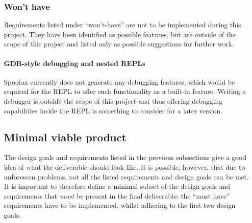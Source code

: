 \subsubsection{Won't have}

Requirements listed under ``won't-have'' are not to be implemented during this
project. They have been identified as possible features, but are outside of the
scope of this project and listed only as possible suggestions for further work.

\paragraph{GDB-style debugging and nested REPLs} Spoofax currently does not
generate any debugging features, which would be required for the REPL to offer
such functionality as a built-in feature. Writing a debugger is outside
the scope of this project and thus offering debugging capabilities inside
the REPL is something to consider for a later version.

\subsection{Minimal viable product}
\label{ssec:mvp}

The design goals and requirements listed in the previous subsections give a good
idea of what the deliverable should look like. It is possible, however, that due
to unforeseen problems, not all the listed requirements and design goals can be
met. It is important to therefore define a minimal subset of the design goals
and requirements that \emph{must} be present in the final deliverable: the
``must have'' requirements have to be implemented, whilst adhering to the first
two design goals.


